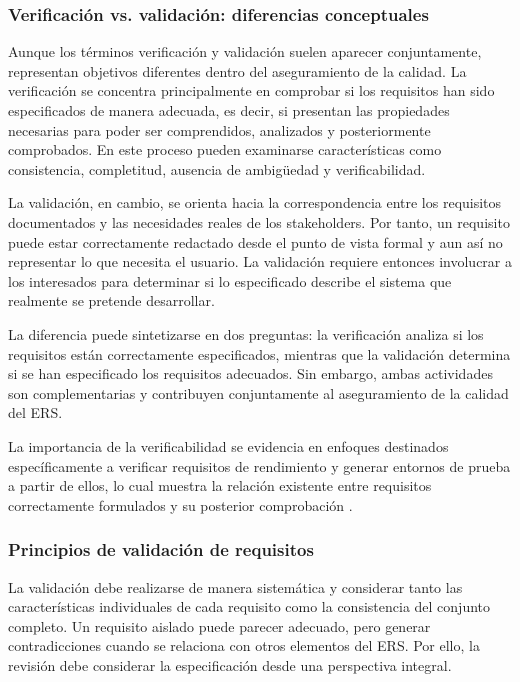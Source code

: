\documentclass[journal,onecolumn]{IEEEtran}
\begin{document}
	\subsubsection{Verificación vs. validación: diferencias conceptuales}
	
	Aunque los términos verificación y validación suelen aparecer conjuntamente, representan objetivos diferentes dentro del aseguramiento de la calidad. La verificación se concentra principalmente en comprobar si los requisitos han sido especificados de manera adecuada, es decir, si presentan las propiedades necesarias para poder ser comprendidos, analizados y posteriormente comprobados. En este proceso pueden examinarse características como consistencia, completitud, ausencia de ambigüedad y verificabilidad.
	
	La validación, en cambio, se orienta hacia la correspondencia entre los requisitos documentados y las necesidades reales de los stakeholders. Por tanto, un requisito puede estar correctamente redactado desde el punto de vista formal y aun así no representar lo que necesita el usuario. La validación requiere entonces involucrar a los interesados para determinar si lo especificado describe el sistema que realmente se pretende desarrollar.
	
	La diferencia puede sintetizarse en dos preguntas: la verificación analiza si los requisitos están correctamente especificados, mientras que la validación determina si se han especificado los requisitos adecuados. Sin embargo, ambas actividades son complementarias y contribuyen conjuntamente al aseguramiento de la calidad del ERS.
	
	La importancia de la verificabilidad se evidencia en enfoques destinados específicamente a verificar requisitos de rendimiento y generar entornos de prueba a partir de ellos, lo cual muestra la relación existente entre requisitos correctamente formulados y su posterior comprobación \cite{Abdeen2022}.
	
	\subsubsection{Principios de validación de requisitos}
	
	La validación debe realizarse de manera sistemática y considerar tanto las características individuales de cada requisito como la consistencia del conjunto completo. Un requisito aislado puede parecer adecuado, pero generar contradicciones cuando se relaciona con otros elementos del ERS. Por ello, la revisión debe considerar la especificación desde una perspectiva integral.
	
\end{document}
